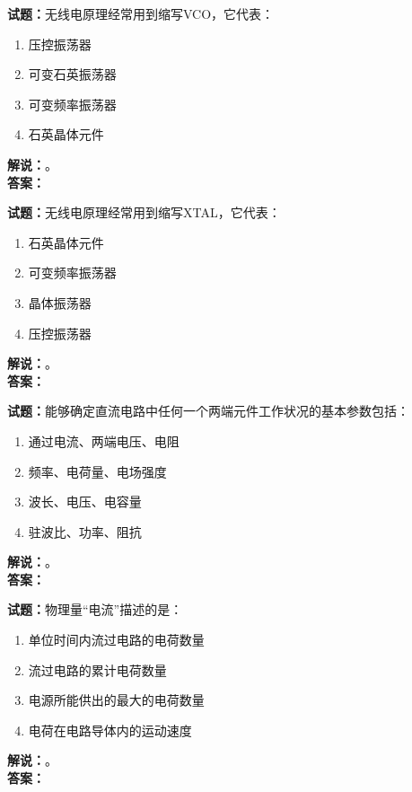 \documentclass{ctexbook}
\begin{document}
\vspace{\baselineskip}

\noindent\textbf{试题：}无线电原理经常用到缩写VCO，它代表：
\begin{enumerate}[leftmargin=3em]
  \item 压控振荡器
  \item 可变石英振荡器
  \item 可变频率振荡器
  \item 石英晶体元件
\end{enumerate}
\noindent\textbf{解说：}\textbf{}。\\\noindent\textbf{答案：}

\vspace{\baselineskip}

\noindent\textbf{试题：}无线电原理经常用到缩写XTAL，它代表：
\begin{enumerate}[leftmargin=3em]
  \item 石英晶体元件
  \item 可变频率振荡器
  \item 晶体振荡器
  \item 压控振荡器
\end{enumerate}
\noindent\textbf{解说：}\textbf{}。\\\noindent\textbf{答案：}

\vspace{\baselineskip}

\noindent\textbf{试题：}能够确定直流电路中任何一个两端元件工作状况的基本参数包括：
\begin{enumerate}[leftmargin=3em]
  \item 通过电流、两端电压、电阻
  \item 频率、电荷量、电场强度
  \item 波长、电压、电容量
  \item 驻波比、功率、阻抗
\end{enumerate}
\noindent\textbf{解说：}\textbf{}。\\\noindent\textbf{答案：}

\vspace{\baselineskip}

\noindent\textbf{试题：}物理量“电流”描述的是：
\begin{enumerate}[leftmargin=3em]
  \item 单位时间内流过电路的电荷数量
  \item 流过电路的累计电荷数量
  \item 电源所能供出的最大的电荷数量
  \item 电荷在电路导体内的运动速度
\end{enumerate}
\noindent\textbf{解说：}\textbf{}。\\\noindent\textbf{答案：}
\end{document}
